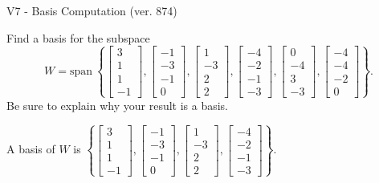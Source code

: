 \begin{exercise}
  \begin{exerciseTitle}V7 - Basis Computation (ver. 874)\end{exerciseTitle}
  \begin{exerciseStatement}
    Find a basis for the subspace 
\[W=\mathrm{span}\ \left\{\left[\begin{array}{r}
3 \\
1 \\
1 \\
-1
\end{array}\right] , \left[\begin{array}{r}
-1 \\
-3 \\
-1 \\
0
\end{array}\right] , \left[\begin{array}{r}
1 \\
-3 \\
2 \\
2
\end{array}\right] , \left[\begin{array}{r}
-4 \\
-2 \\
-1 \\
-3
\end{array}\right] , \left[\begin{array}{r}
0 \\
-4 \\
3 \\
-3
\end{array}\right] , \left[\begin{array}{r}
-4 \\
-4 \\
-2 \\
0
\end{array}\right]\right\}.\]
 Be sure to explain why your result is a basis.


  \end{exerciseStatement}
  \begin{exerciseAnswer}
   A basis of \(W\) is  \(\left\{\left[\begin{array}{r}
3 \\
1 \\
1 \\
-1
\end{array}\right] , \left[\begin{array}{r}
-1 \\
-3 \\
-1 \\
0
\end{array}\right] , \left[\begin{array}{r}
1 \\
-3 \\
2 \\
2
\end{array}\right] , \left[\begin{array}{r}
-4 \\
-2 \\
-1 \\
-3
\end{array}\right]\right\}\).
  


  \end{exerciseAnswer}
\end{exercise}